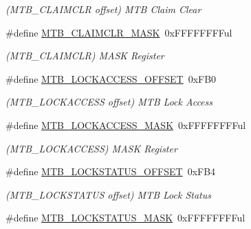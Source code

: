\begin{DoxyCompactItemize}
\begin{DoxyCompactList}\small\item\em (M\+T\+B\+\_\+\+C\+L\+A\+I\+M\+C\+L\+R offset) M\+T\+B Claim Clear \end{DoxyCompactList}\item 
\hypertarget{group___s_a_m_l21___m_t_b_ga0fcec3fe7a6aedc66116beb287a403bd}{}\#define \hyperlink{group___s_a_m_l21___m_t_b_ga0fcec3fe7a6aedc66116beb287a403bd}{M\+T\+B\+\_\+\+C\+L\+A\+I\+M\+C\+L\+R\+\_\+\+M\+A\+S\+K}~0x\+F\+F\+F\+F\+F\+F\+F\+Ful\label{group___s_a_m_l21___m_t_b_ga0fcec3fe7a6aedc66116beb287a403bd}

\begin{DoxyCompactList}\small\item\em (M\+T\+B\+\_\+\+C\+L\+A\+I\+M\+C\+L\+R) M\+A\+S\+K Register \end{DoxyCompactList}\item 
\hypertarget{group___s_a_m_l21___m_t_b_ga6848fd67964e48dea5e8aab4c5f6ee6d}{}\#define \hyperlink{group___s_a_m_l21___m_t_b_ga6848fd67964e48dea5e8aab4c5f6ee6d}{M\+T\+B\+\_\+\+L\+O\+C\+K\+A\+C\+C\+E\+S\+S\+\_\+\+O\+F\+F\+S\+E\+T}~0x\+F\+B0\label{group___s_a_m_l21___m_t_b_ga6848fd67964e48dea5e8aab4c5f6ee6d}

\begin{DoxyCompactList}\small\item\em (M\+T\+B\+\_\+\+L\+O\+C\+K\+A\+C\+C\+E\+S\+S offset) M\+T\+B Lock Access \end{DoxyCompactList}\item 
\hypertarget{group___s_a_m_l21___m_t_b_ga8660020c643126005e5c89e4aac34281}{}\#define \hyperlink{group___s_a_m_l21___m_t_b_ga8660020c643126005e5c89e4aac34281}{M\+T\+B\+\_\+\+L\+O\+C\+K\+A\+C\+C\+E\+S\+S\+\_\+\+M\+A\+S\+K}~0x\+F\+F\+F\+F\+F\+F\+F\+Ful\label{group___s_a_m_l21___m_t_b_ga8660020c643126005e5c89e4aac34281}

\begin{DoxyCompactList}\small\item\em (M\+T\+B\+\_\+\+L\+O\+C\+K\+A\+C\+C\+E\+S\+S) M\+A\+S\+K Register \end{DoxyCompactList}\item 
\hypertarget{group___s_a_m_l21___m_t_b_ga10490c8254804606534f9dc2a3955b56}{}\#define \hyperlink{group___s_a_m_l21___m_t_b_ga10490c8254804606534f9dc2a3955b56}{M\+T\+B\+\_\+\+L\+O\+C\+K\+S\+T\+A\+T\+U\+S\+\_\+\+O\+F\+F\+S\+E\+T}~0x\+F\+B4\label{group___s_a_m_l21___m_t_b_ga10490c8254804606534f9dc2a3955b56}

\begin{DoxyCompactList}\small\item\em (M\+T\+B\+\_\+\+L\+O\+C\+K\+S\+T\+A\+T\+U\+S offset) M\+T\+B Lock Status \end{DoxyCompactList}\item 
\hypertarget{group___s_a_m_l21___m_t_b_gae1ca719b631edc5b3bbe331b2455f679}{}\#define \hyperlink{group___s_a_m_l21___m_t_b_gae1ca719b631edc5b3bbe331b2455f679}{M\+T\+B\+\_\+\+L\+O\+C\+K\+S\+T\+A\+T\+U\+S\+\_\+\+M\+A\+S\+K}~0x\+F\+F\+F\+F\+F\+F\+F\+Ful\label{group___s_a_m_l21___m_t_b_gae1ca719b631edc5b3bbe331b2455f679}


\end{DoxyCompactItemize}
